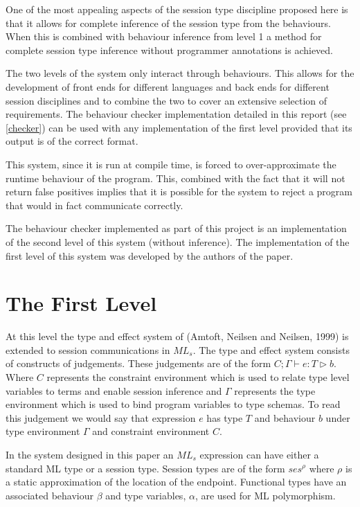 One of the most appealing aspects of the session type discipline proposed here is that it allows for complete inference of the session type from the behaviours. When this is combined with behaviour inference from level 1 a method for complete session type inference without programmer annotations is achieved. 

The two levels of the system only interact through behaviours. This allows for the development of front ends for different languages and back ends for different session disciplines and to combine the two to cover an extensive selection of requirements. The behaviour checker implementation detailed in this report (see \ref{checker}) can be used with any implementation of the first level provided that its output is of the correct format.

This system, since it is run at compile time, is forced to over-approximate the runtime behaviour of the program. This, combined with the fact that it will not return false positives implies that it is possible for the system to reject a program that would in fact communicate correctly. 

The behaviour checker implemented as part of this project is an implementation of the second level of this system (without inference). The implementation of the first level of this system was developed by the authors of the paper. 

\section{The First Level} \label{level1}

At this level the type and effect system of (Amtoft, Neilsen and Neilsen, 1999) \cite{amtoft} is extended to session communications in $ML_s$. The type and effect system consists of constructs of judgements. These judgements are of the form $C;\Gamma \vdash e : T \triangleright b$. Where $C$ represents the constraint environment which is used to relate type level variables to terms and enable session inference and $\Gamma$ represents the type environment which is used to bind program variables to type schemas. To read this judgement we would say that expression $e$ has type $T$ and behaviour $b$ under type environment $\Gamma$ and constraint environment $C$.

In the system designed in this paper \cite{paper1} an $ML_s$ expression can have either a standard ML type or a session type. Session types are of the form $ses^\rho$ where $\rho$ is a static approximation of the location of the endpoint. Functional types have an associated behaviour $\beta$ and type variables, $\alpha$, are used for ML polymorphism. 

